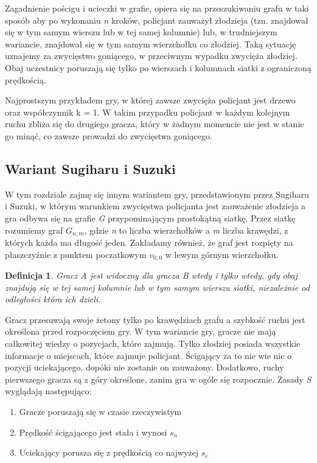 \documentclass[brudnopis]{xmgr}
\newtheorem{Definicja}{Definicja} \theoremstyle{definition}
\begin{document}
Zagadnienie pościgu i ucieczki w grafie, opiera się na przeszukiwaniu grafu w taki sposób aby po wykonaniu \textit{n} kroków, policjant zauważył złodzieja (tzn. znajdował się w tym samym wierszu lub w tej samej kolumnie) lub, w trudniejszym wariancie, znajdował się w tym samym wierzchołku co złodziej. Taką sytuację uznajemy za zwycięstwo goniącego, w przeciwnym wypadku zwycięża złodziej. Obaj uczestnicy poruszają się tylko po wierszach i kolumnach siatki z ograniczoną prędkością.

Najprostszym przykładem gry, w której zawsze zwycięża policjant jest drzewo oraz współczynnik k = 1. W takim przypadku policjant w każdym kolejnym ruchu zbliża się do drugiego gracza, który w żadnym momencie nie jest w stanie go minąć, co zawsze prowadzi do zwycięstwa goniącego.

\subsection{Wariant Sugiharu i Suzuki}
W tym rozdziale zajmę się innym wariantem gry, przedstawionym przez Sugiharu i Suzuki, w którym warunkiem zwycięstwa policjanta jest zauważenie złodzieja a gra odbywa się na grafie \textit{G} przypominającym prostokątną siatkę.
Przez siatkę rozumiemy graf \textit{$G_{n,m}$}, gdzie \textit{n} to liczba wierzchołków a \textit{m} liczba krawędzi, z których każda ma długość jeden. Zakładamy również, że graf jest rozpięty na płaszczyźnie z punktem poczatkowym \textit{$v_{0,0}$} w lewym górnym wierzchołku.
\begin{Definicja}
  Gracz A \textnormal{jest widoczny} dla gracza B wtedy i tylko wtedy, gdy obaj znajdują się w tej samej kolumnie lub w tym samym wierszu siatki, niezależnie od odległości która ich dzieli.
\end{Definicja}

Gracz przesuwają swoje żetony tylko po krawędziach grafu a szybkość ruchu jest określona przed rozpoczęciem gry.
W tym wariancie gry, gracze nie mają całkowitej wiedzy o pozycjach, które zajmują. Tylko złodziej posiada wszystkie informacje o miejscach, które zajmuje policjant. Ścigający za to nie wie nic o pozycji uciekającego, dopóki nie zostanie on zauważony. Dodatkowo, ruchy pierwszego gracza są z góry określone, zanim gra w ogóle się rozpocznie.
Zasady \textit{S} wyglądają następująco:
\begin{enumerate}
  \item Gracze poruszają się w czasie rzeczywistym
  \item Prędkość ścigającego jest stała i wynosi $s_n$
  \item Uciekający porusza się z prędkością co najwyżej $s_c$
\end{enumerate}
\end{document}
